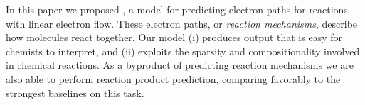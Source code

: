 
In this paper we proposed \ourModel, a model for predicting electron paths for reactions with linear electron flow.
These electron paths, or {\em reaction mechanisms}, describe how molecules react together. 
Our model (i) produces output that is easy for chemists to interpret, and (ii) exploits the sparsity and compositionality involved in chemical reactions.
As a byproduct of predicting reaction mechanisms we are also able to perform reaction product prediction,
comparing favorably to the strongest baselines on this task. 
%
%
%
%
%

